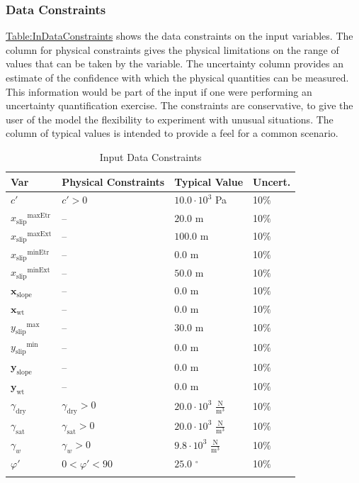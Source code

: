 \documentclass[12pt]{article}
\begin{document}
\subsubsection{Data Constraints}
\label{Sec:DataConstraints}
\hyperref[Table:InDataConstraints]{Table:InDataConstraints} shows the data constraints on the input variables. The column for physical constraints gives the physical limitations on the range of values that can be taken by the variable. The uncertainty column provides an estimate of the confidence with which the physical quantities can be measured. This information would be part of the input if one were performing an uncertainty quantification exercise. The constraints are conservative, to give the user of the model the flexibility to experiment with unusual situations. The column of typical values is intended to provide a feel for a common scenario.
\begin{longtable}{l l l l}
\toprule
\textbf{Var} & \textbf{Physical Constraints} & \textbf{Typical Value} & \textbf{Uncert.}
\\
\midrule
\endhead
$c'$ & $c'>0$ & $10.0\cdot{}10^{3}$ Pa & 10$\%$
\\
${{x_{\text{slip}}}^{\text{maxEtr}}}$ & -- & $20.0$ m & 10$\%$
\\
${{x_{\text{slip}}}^{\text{maxExt}}}$ & -- & $100.0$ m & 10$\%$
\\
${{x_{\text{slip}}}^{\text{minEtr}}}$ & -- & $0.0$ m & 10$\%$
\\
${{x_{\text{slip}}}^{\text{minExt}}}$ & -- & $50.0$ m & 10$\%$
\\
${\mathbf{x}_{\text{slope}}}$ & -- & $0.0$ m & 10$\%$
\\
${\mathbf{x}_{\text{wt}}}$ & -- & $0.0$ m & 10$\%$
\\
${{y_{\text{slip}}}^{\text{max}}}$ & -- & $30.0$ m & 10$\%$
\\
${{y_{\text{slip}}}^{\text{min}}}$ & -- & $0.0$ m & 10$\%$
\\
${\mathbf{y}_{\text{slope}}}$ & -- & $0.0$ m & 10$\%$
\\
${\mathbf{y}_{\text{wt}}}$ & -- & $0.0$ m & 10$\%$
\\
${γ_{\text{dry}}}$ & ${γ_{\text{dry}}}>0$ & $20.0\cdot{}10^{3}$ $\frac{\text{N}}{\text{m}^{3}}$ & 10$\%$
\\
${γ_{\text{sat}}}$ & ${γ_{\text{sat}}}>0$ & $20.0\cdot{}10^{3}$ $\frac{\text{N}}{\text{m}^{3}}$ & 10$\%$
\\
${γ_{w}}$ & ${γ_{w}}>0$ & $9.8\cdot{}10^{3}$ $\frac{\text{N}}{\text{m}^{3}}$ & 10$\%$
\\
$φ'$ & $0<φ'<90$ & $25.0$ ${}^{\circ}$ & 10$\%$
\\
\bottomrule
\caption{Input Data Constraints}
\label{Table:InDataConstraints}
\end{longtable}
\end{document}
